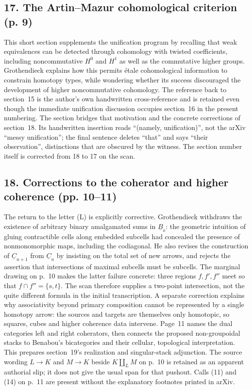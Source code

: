 \documentclass[10pt,oneside]{book}
\begin{document}
\subsection*{17. The Artin--Mazur cohomological criterion (p. 9)}
This short section supplements the unification program by recalling that weak equivalences can be detected through cohomology with twisted coefficients, including noncommutative $H^0$ and $H^1$ as well as the commutative higher groups. Grothendieck explains how this permits étale cohomological information to constrain homotopy types, while wondering whether its success discouraged the development of higher noncommutative cohomology. The reference back to section~15 is the author's own handwritten cross-reference and is retained even though the immediate unification discussion occupies section~16 in the present numbering. The section bridges that motivation and the concrete corrections of section~18. Its handwritten insertion reads ``(namely, unification)'', not the arXiv ``messy unification''; the final sentence deletes ``that'' and says ``their observation'', distinctions that are obscured by the witness. The section number itself is corrected from 18 to 17 on the scan.

\subsection*{18. Corrections to the coherator and higher coherence (pp. 10--11)}
The return to the letter (L) is explicitly corrective. Grothendieck withdraws the existence of arbitrary binary amalgamated sums in $\underline B_o$: the geometric intuition of gluing contractible cells along embedded subcells had concealed the presence of nonmonomorphic maps, including the codiagonal. He also revises the construction of $\underline C_{n+1}$ from $\underline C_n$ by insisting on the total set of new arrows, and rejects the assertion that intersections of maximal subcells must be subcells. The marginal drawing on p.~10 makes the latter failure concrete: three regions $f,f',f''$ meet so that $f\cap f''=\{s,t\}$. The scan therefore supplies a two-point intersection, not the quite different formula in the initial transcription. A separate correction explains why associativity beyond primary composition cannot be represented by a single homotopy arrow: the sources and targets are themselves only homotopic, so squares, cubes and higher coherence data intervene. Page~11 names the dual categories left and right coherators, then connects the proposed non-groupoidal stacks to Benabou's bicategories and their cellular, topological interpretation. This prepares section~19's realization and singular-stack adjunction. The source wording $L\to K$ and $M\to K$ beside $K\amalg_L M$ on p.~10 is retained as an apparent authorial slip; it does not give the usual span for that pushout. Calls (11) and (14) on p.~11 are present without the explanatory footnotes printed in arXiv.
\end{document}
